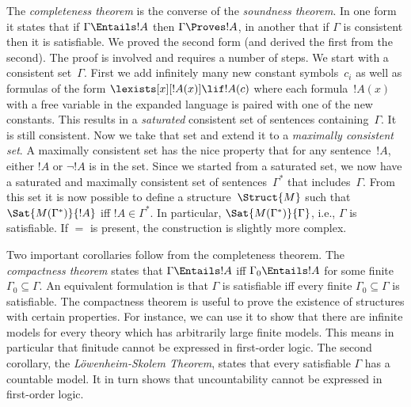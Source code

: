 The \emph{completeness theorem} is the converse of the \emph{soundness
  theorem}. In one form it states that if $\Gamma \Entails !A$ then
$\Gamma \Proves !A$, in another that if $\Gamma$ is consistent then it
is satisfiable. We proved the second form (and derived the first from
the second). The proof is involved and requires a number of steps. We
start with a consistent set~$\Gamma$. First we add infinitely many
new constant symbols~$c_i$ as well as formulas of the form
$\lexists[x][!A(x)] \lif !A(c)$ where each formula~$!A(x)$ with a free
variable in the expanded language is paired with one of the new
constants. This results in a \emph{saturated} consistent set of
sentences containing~$\Gamma$. It is still consistent. Now we take
that set and extend it to a \emph{maximally consistent set}. A
maximally consistent set has the nice property that for any
sentence~$!A$, either $!A$ or $\lnot !A$ is in the set. Since we started
from a saturated set, we now have a saturated and maximally consistent
set of sentences~$\Gamma^*$ that includes~$\Gamma$. From this set it
is now possible to define a structure~$\Struct{M}$ such that
$\Sat{M(\Gamma^*)}{!A}$ iff $!A \in \Gamma^*$. In particular,
$\Sat{M(\Gamma^*)}{\Gamma}$, i.e., $\Gamma$ is satisfiable. If $=$ is
present, the construction is slightly more complex.

Two important corollaries follow from the completeness theorem. The
\emph{compactness theorem} states that $\Gamma \Entails !A$ iff
$\Gamma_0 \Entails !A$ for some finite $\Gamma_0 \subseteq \Gamma$. An
equivalent formulation is that $\Gamma$ is satisfiable iff every
finite $\Gamma_0 \subseteq \Gamma$ is satisfiable. The compactness
theorem is useful to prove the existence of structures with certain
properties. For instance, we can use it to show that there are
infinite models for every theory which has arbitrarily large finite
models. This means in particular that finitude cannot be expressed in
first-order logic. The second corollary, the \emph{L\"owenheim-Skolem
  Theorem}, states that every satisfiable $\Gamma$ has a countable
model. It in turn shows that uncountability cannot be expressed in
first-order logic.
